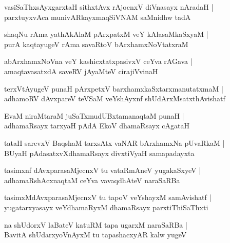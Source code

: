 \begin{shloka}
vasiSaThxsAyxgarxtaH sithxtAvx rAjocnxV diVnasayx nAradaH |\\
parxtuyxvAca munivARkayxmaqSiVNAM saMnidhw tadA
\end{shloka}

\begin{shloka}
shaqNu rAma yathAkAlaM pArxpatxM veY kAlasaMkaSxyaM |\\
purA kaqtayugeV rAma savaRtoV bArxhamxNoVtatxraM
\end{shloka}

\begin{shloka}
abArxhamxNoVna veY kashicxtatxpasivxV ceYva rAGava |\\
amaqtavasatxdA saveRV jAyaMteV cirajiVvinaH 
\end{shloka}

\begin{shloka}
terxVtAyugeV punaH pArxpetxV barxhamxkaSxtarxmanutatxmaM |\\
adhamoRV dAvxpareV teVSaM veYshAyxnf shUdArxMsatxthAvishatf 
\end{shloka}

\begin{shloka}
EvaM niraMtaraM juSaTxmudUBxtamanaqtaM punaH |\\
adhamaRsayx tarxyaH pAdA EkoV dhamaRsayx cAgataH 
\end{shloka}

\begin{shloka}
tataH sarevxV BaqshaM tarxsAtx vaNAR bArxhamxNa pUvaRkaM |\\
BUyaH pAdasatxvXdhamaRsayx divxtiVyaH samapadayxta
\end{shloka}

\begin{shloka}
tasimxnf dAvxparasaMjecnxV tu vataRmAneV yugakaSxyeV |\\
adhamaRshAcxnaqtaM ceYva vavaqdhAteV naraSaRBa
\end{shloka}

\begin{shloka}
tasimxMdAvxparasaMjecnxV tu tapoV veYshayxM samAvishatf |\\
yugatarxyasayx veYdhamaRyxM dhamaRsayx parxtiThiSaThxti
\end{shloka}

\begin{shloka}
na shUdorxV laBateV katuRM tapa ugarxM naraSaRBa |\\
BavitA shUdarxyoVnAyxM tu tapashacxyAR kalw yugeV 
\end{shloka}

